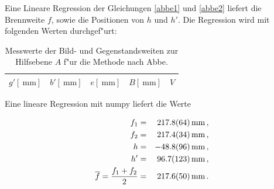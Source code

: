 



		Eine Lineare Regression der Gleichungen \eqref{abbe1} und \eqref{abbe2} liefert die Brennweite $f$, sowie die Positionen von $h$ und $h'$.
		Die Regression wird mit folgenden Werten durchgef"urt:

		\begin{table}[!h]
			\begin{center}
				\label{tabelle:abbe}
				\caption{Messwerte der Bild- und Gegenstandsweiten zur Hilfsebene $A$ f"ur die Methode nach Abbe.}
				\begin{tabular}{|c|c|c|c|c|}
					\hline 
					$g' [\SI{}{\milli \meter}]$ & $b' [\SI{}{\milli \meter}]$ & $e [\SI{}{\milli \meter}]$ &$B [\SI{}{\milli \meter}]$ & $V$ \\
					\hline 
					\hline
					
					\hline 
				\end{tabular}
			\end{center}
		\end{table}

		Eine lineare Regression mit numpy liefert die Werte

		\begin{eqnarray*}
			f_1 & = & \SI{217.8 (64)}{\milli \meter} \, , \\
			f_2 & = & \SI{217.4 (34)}{\milli \meter} \, , \\
			h & = & \SI{-48.8 (96)}{\milli \meter} \, , \\
			h' & = & \SI{96.7 (123)}{\milli \meter} \, , \\
			\overline{f} = \frac{f_1 + f_2}{2} & = & \SI{217.6 (50)}{\milli \meter}\,.
		\end{eqnarray*}

